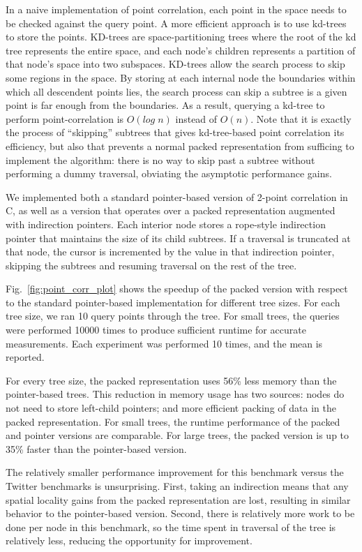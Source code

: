 \documentclass[showabstract,showacknowledgments,showpreface,showdedication,school]{iuphd}
\theoremstyle{nonumberplain}
\newcommand{\figref}[1]{Fig.~\ref{#1}}
\begin{document}
In a naive implementation of point correlation, each point in the space needs
to be checked against the query point.
A more efficient approach is to use kd-trees~\cite{bentley75} to store the
points. KD-trees are space-partitioning trees where the root of the kd tree represents the entire space, and each node's children represents a partition of that node's space into two subspaces.
KD-trees allow the search
process to skip some regions in the space. By storing at each internal node
the boundaries within which all descendent points lies, the search process can
skip a subtree is a given point is far enough from the boundaries. As a
result, querying a kd-tree to perform point-correlation is $O(log\; n)$ instead
of $O(n)$. Note that it is exactly the process of ``skipping'' subtrees that
gives kd-tree-based point correlation its efficiency, but also that prevents a
normal packed representation from sufficing to implement the algorithm: there
is no way to skip past a subtree without performing a dummy traversal,
obviating the asymptotic performance gains.

We implemented both a standard pointer-based version of 2-point correlation in
C, as well as a version that operates over a packed representation augmented
with indirection pointers. Each interior node stores a rope-style
indirection pointer that maintains the size of its child subtrees. If a
traversal is truncated at that node, the cursor is incremented by the value in
that indirection pointer, skipping the subtrees and resuming traversal on the
rest of the tree.

\figref{fig:point_corr_plot} shows the speedup of the packed version
with respect to the standard pointer-based implementation for
different tree sizes. For each tree size, we ran 10 query points
through the tree. For small trees, the queries were performed 10000
times to produce sufficient runtime for accurate measurements. Each
experiment was performed 10 times, and the mean is reported.

For every tree size, the packed representation uses 56\% less memory
than the pointer-based trees. This reduction in memory usage has two
sources: nodes do not need to store left-child pointers; and more
efficient packing of data in the packed representation. For small
trees, the runtime performance of the packed and pointer versions are
comparable. For large trees, the packed version is up to 35\% faster
than the pointer-based version.

The relatively smaller performance improvement for this
benchmark versus the Twitter benchmarks is unsurprising. First, taking an
indirection means that any spatial locality gains from the packed
representation are lost, resulting in similar behavior to the
pointer-based version. Second, there is relatively more work to be
done per node in this benchmark, so the time spent in traversal of the
tree is relatively less, reducing the opportunity for improvement.
\end{document}
